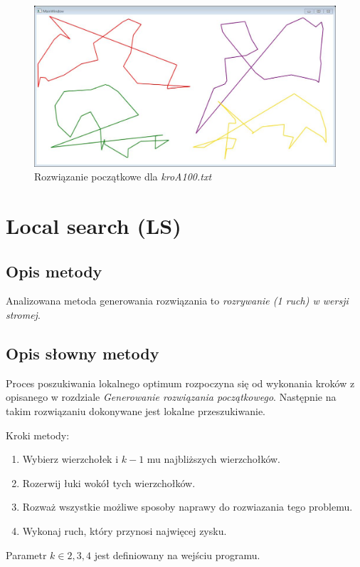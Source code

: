 \documentclass{article}
\begin{document}
\begin{figure}[h!]
\centering\includegraphics[width=17cm]{img/rys1.png}
\caption{Rozwiązanie początkowe dla \emph{kroA100.txt}}
\end{figure}

\section{Local search (LS)}
\subsection{Opis metody}
Analizowana metoda generowania rozwiązania to \emph{rozrywanie (1 ruch) w wersji stromej}.

\subsection{Opis słowny metody}
Proces poszukiwania lokalnego optimum rozpoczyna się od wykonania kroków z opisanego w rozdziale \emph{Generowanie rozwiązania początkowego}. Następnie na takim rozwiązaniu dokonywane jest lokalne przeszukiwanie.

Kroki metody:
	\begin{enumerate}
		\item Wybierz wierzchołek i $k-1$ mu najbliższych wierzchołków. 
		\item Rozerwij łuki wokół tych wierzchołków.
		\item Rozważ wszystkie możliwe sposoby naprawy do rozwiazania tego problemu.
		\item Wykonaj ruch, który przynosi najwięcej zysku.
	\end{enumerate}

Parametr $k \in {2,3,4}$ jest definiowany na wejściu programu.
\end{document}
